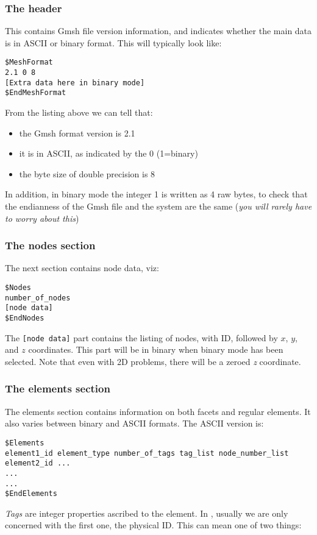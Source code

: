 \subsubsection*{The header}\label{sect:gmsh_header_section}
This contains Gmsh file version information, and indicates whether 
the main data is in ASCII or binary format. This will typically look like:
\begin{lstlisting}
$MeshFormat
2.1 0 8
[Extra data here in binary mode]
$EndMeshFormat
\end{lstlisting}

From the listing above we can tell that:
\begin{itemize}
\item the Gmsh format version is 2.1
\item it is in ASCII, as indicated by the 0 (1=binary)
\item the byte size of double precision is 8
\end{itemize}
In addition, in binary mode the integer 1 is written as 4 raw bytes, to check that the endianness of the Gmsh file and the system are the same (\textit{you will rarely have to worry about this})



\subsubsection*{The nodes section}\label{sect:gmsh_nodes_section}

The next section contains node data, viz:
\begin{lstlisting}
$Nodes
number_of_nodes
[node data]
$EndNodes
\end{lstlisting}

The \lstinline+[node data]+ part contains the listing of nodes, with ID,
followed by $x$, $y$, and $z$ coordinates. This part
will be in binary when binary mode has been selected. Note that even with 2D
problems, there will be a zeroed \textit{z} coordinate.



\subsubsection*{The elements section}\label{sect:gmsh_elements_section}

The elements section contains information on both facets and regular
elements. It also varies between binary and ASCII formats. The ASCII version
is:

\begin{lstlisting}
$Elements
element1_id element_type number_of_tags tag_list node_number_list
element2_id ...
...
...
$EndElements
\end{lstlisting}
\textit{Tags} are integer properties ascribed to the element. In \fluidity,
usually we are only concerned with the first one, the physical ID. This can mean
one of two things:


